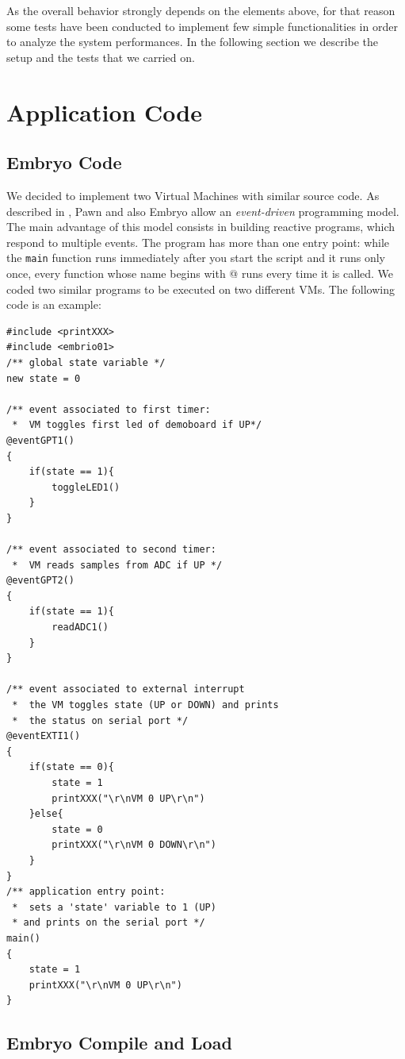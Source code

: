 \documentclass[a4paper,10pt]{article}
\begin{document}
\begin{multicols}{2}
As the overall behavior strongly depends on the elements above, for that reason some tests have been conducted to implement few simple functionalities in order to analyze the system performances. In the following section we describe the setup and the tests that we carried on.


\section{Application Code}

\subsection{Embryo Code}

We decided to implement two Virtual Machines with similar source code. As described in \cite{pawnGuide}, Pawn and also Embryo allow an \textit{event-driven} programming model. The main advantage of this model consists in building reactive programs, which respond to multiple events. The program has more than one entry point: while the \texttt{main} function runs immediately after you start the script and it runs only once, every function whose name begins with @ runs every time it is called. We coded two similar programs to be executed on two different VMs. The following code is an example:
\medskip
\begin{lstlisting}[caption={EmbrIO first VM}]
#include <printXXX>
#include <embrio01>
/** global state variable */
new state = 0

/** event associated to first timer:
 *  VM toggles first led of demoboard if UP*/
@eventGPT1()
{
	if(state == 1){
		toggleLED1()
	}
}

/** event associated to second timer:
 *  VM reads samples from ADC if UP */
@eventGPT2()
{
	if(state == 1){
		readADC1()
	}
}

/** event associated to external interrupt
 *  the VM toggles state (UP or DOWN) and prints
 *  the status on serial port */
@eventEXTI1()
{
	if(state == 0){
		state = 1
		printXXX("\r\nVM 0 UP\r\n")
	}else{
		state = 0
		printXXX("\r\nVM 0 DOWN\r\n")
	}
}
/** application entry point:
 *  sets a 'state' variable to 1 (UP)
 * and prints on the serial port */
main()
{
	state = 1
    printXXX("\r\nVM 0 UP\r\n")
}
\end{lstlisting}

\subsection{Embryo Compile and Load}


\end{multicols}
\end{document}
